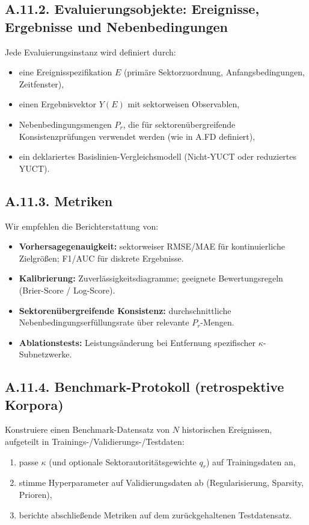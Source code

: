 \documentclass[13pt,a4paper]{article}
\begin{document}
	\subsection*{A.11.2. Evaluierungsobjekte: Ereignisse, Ergebnisse und Nebenbedingungen}
	Jede Evaluierungsinstanz wird definiert durch:
	\begin{itemize}[leftmargin=*]
		\item eine Ereignisspezifikation $E$ (primäre Sektorzuordnung, Anfangsbedingungen, Zeitfenster),
		\item einen Ergebnisvektor $Y(E)$ mit sektorweisen Observablen,
		\item Nebenbedingungsmengen $P_r$, die für sektorenübergreifende Konsistenzprüfungen verwendet werden (wie in A.FD definiert),
		\item ein deklariertes Basislinien-Vergleichsmodell (Nicht-YUCT oder reduziertes YUCT).
	\end{itemize}
	
	\subsection*{A.11.3. Metriken}
	Wir empfehlen die Berichterstattung von:
	\begin{itemize}[leftmargin=*]
		\item \textbf{Vorhersagegenauigkeit:} sektorweiser RMSE/MAE für kontinuierliche Zielgrößen; F1/AUC für diskrete Ergebnisse.
		\item \textbf{Kalibrierung:} Zuverlässigkeitsdiagramme; geeignete Bewertungsregeln (Brier-Score / Log-Score).
		\item \textbf{Sektorenübergreifende Konsistenz:} durchschnittliche Nebenbedingungserfüllungsrate über relevante $P_r$-Mengen.
		\item \textbf{Ablationstests:} Leistungsänderung bei Entfernung spezifischer $\kappa$-Subnetzwerke.
	\end{itemize}
	
	\subsection*{A.11.4. Benchmark-Protokoll (retrospektive Korpora)}
	Konstruiere einen Benchmark-Datensatz von $N$ historischen Ereignissen, aufgeteilt in Trainings-/Validierungs-/Testdaten:
	\begin{enumerate}[leftmargin=*]
		\item passe $\kappa$ (und optionale Sektorautoritätsgewichte $q_r$) auf Trainingsdaten an,
		\item stimme Hyperparameter auf Validierungsdaten ab (Regularisierung, Sparsity, Prioren),
		\item berichte abschließende Metriken auf dem zurückgehaltenen Testdatensatz.
	\end{enumerate}
	
\end{document}
